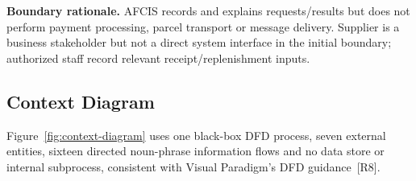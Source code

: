 \documentclass[10pt,a4paper]{article}
\begin{document}
\colorbox{TableGray}{\parbox{\dimexpr\textwidth-2\fboxsep}{\footnotesize
\textbf{Boundary rationale.} AFCIS records and explains requests/results but does not perform payment processing, parcel transport or message delivery. Supplier is a business stakeholder but not a direct system interface in the initial boundary; authorized staff record relevant receipt/replenishment inputs.}}
\newpage

\clearpage
\subsection{Context Diagram}
Figure~\ref{fig:context-diagram} uses one black-box DFD process, seven external entities, sixteen directed noun-phrase information flows and no data store or internal subprocess, consistent with Visual Paradigm's DFD guidance~[R8].
\end{document}
